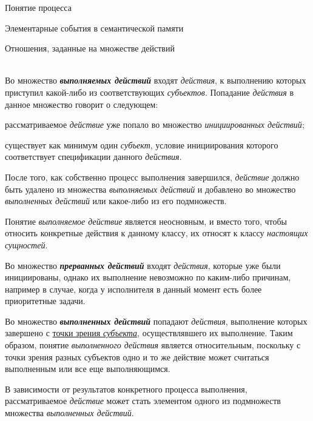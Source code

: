 \begin{frame}{\large Понятие процесса}
\begin{frame}{\large Элементарные события в семантической памяти}
\begin{frame}{Отношения, заданные на множестве действий}
\begin{frame}{}
\end{frame}
\begin{frame}{}
 \\
 \bigskip
Во множество \textbf{\textit{выполняемых действий}} входят \textit{действия}, к выполнению которых приступил какой-либо из соответствующих \textit{субъектов}.
Попадание \textit{действия} в данное множество говорит о следующем:
\begin{textitemize}
	\item рассматриваемое \textit{действие} уже попало во множество \textit{инициированных действий};
	\item существует как минимум один \textit{субъект}, условие инициирования которого соответствует спецификации данного \textit{действия}.
\end{textitemize}

После того, как собственно процесс выполнения завершился, \textit{действие} должно быть удалено из множества \textit{выполняемых действий} и добавлено во множество \textit{выполненных действий} или какое-либо из его подмножеств.

Понятие \textit{выполняемое действие} является неосновным, и вместо того, чтобы относить конкретные действия к данному классу, их относят к классу \textit{настоящих сущностей}.
\end{frame}

\begin{frame}{}
Во множество \textbf{\textit{прерванных действий}} входят \textit{действия}, которые уже были инициированы, однако их выполнение невозможно по каким-либо причинам, например в случае, когда у исполнителя в данный момент есть более приоритетные задачи.

Во множество \textbf{\textit{выполненных действий}} попадают \textit{действия}, выполнение которых завершено с \uline{точки зрения \textit{субъекта}}, осуществлявшего их выполнение. Таким образом, понятие \textit{выполненного действия} является относительным, поскольку с точки зрения разных субъектов одно и то же действие может считаться выполненным или все еще выполняющимся.

В зависимости от результатов конкретного процесса выполнения, рассматриваемое \textit{действие} может стать элементом одного из подмножеств множества \textit{выполненных действий}.
\end{frame}


\end{frame}
\end{frame}
\end{frame}
